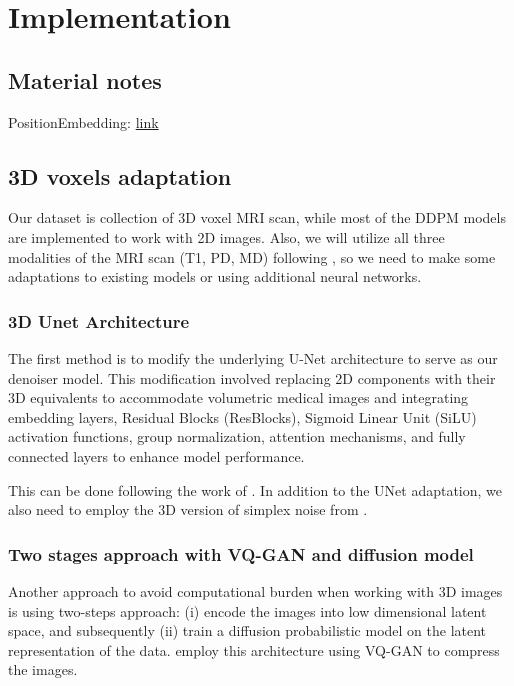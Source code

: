 \section{Implementation}
\label{sec:implementation}

\subsection{Material notes}

PositionEmbedding: \href{https://medium.com/thedeephub/positional-encoding-explained-a-deep-dive-into-transformer-pe-65cfe8cfe10b}{link}

\subsection{3D voxels adaptation}

Our dataset is collection of 3D voxel MRI scan, while most of the DDPM models are implemented to work with 2D images. Also, we will utilize all three modalities of the MRI scan (T1, PD, MD) following \cite{oudoumanessahFrugalUnsupervisedDetection2023}, so we need to make some adaptations to existing models or using additional neural networks. 

\subsubsection{3D Unet Architecture}

The first method is to modify the underlying U-Net architecture to serve as our denoiser model. This modification involved replacing 2D components with their 3D equivalents to accommodate volumetric medical images and integrating embedding layers, Residual Blocks (ResBlocks), Sigmoid Linear Unit (SiLU) activation functions, group normalization, attention mechanisms, and fully connected layers to enhance model performance. 

This can be done following the work of \cite{3D-DDPM}. In addition to the UNet adaptation, we also need to employ the 3D version of simplex noise from \cite{anoDDPM}. 

\subsubsection{Two stages approach with VQ-GAN and diffusion model}

Another approach to avoid computational burden when working with 3D images is using two-steps approach: (i) encode the images into low dimensional latent space, and subsequently (ii) train a diffusion probabilistic model on the latent representation of the data. \cite{khaderDDPM3DVQGan} employ this architecture using VQ-GAN \cite{VQGan} to compress the images. 

